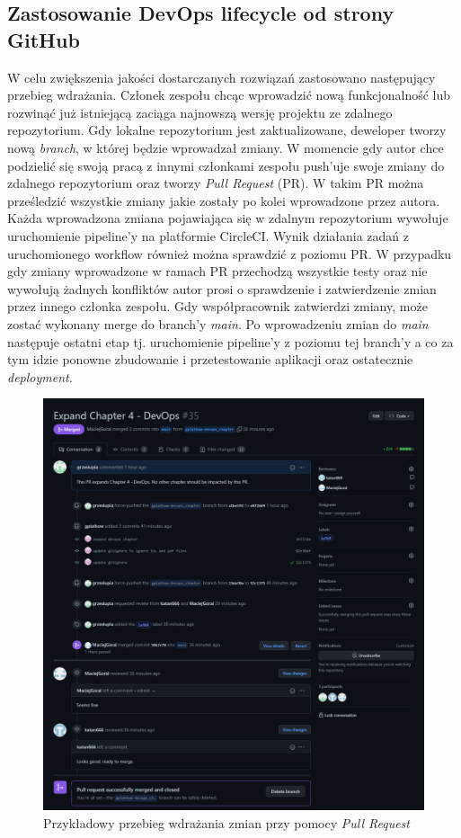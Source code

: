 	\subsection{Zastosowanie DevOps lifecycle od strony GitHub}
	W celu zwiększenia jakości dostarczanych rozwiązań zastosowano następujący przebieg wdrażania. Członek zespołu chcąc wprowadzić nową funkcjonalność lub rozwinąć już istniejącą zaciąga najnowszą wersję projektu ze zdalnego repozytorium. Gdy lokalne repozytorium jest zaktualizowane, deweloper tworzy nową \textit{branch}, w której będzie wprowadzał zmiany. W momencie gdy autor chce podzielić się swoją pracą z innymi członkami zespołu push'uje swoje zmiany do zdalnego repozytorium oraz tworzy \textit{Pull Request} (PR). W takim PR można prześledzić wszystkie zmiany jakie zostały po kolei wprowadzone przez autora. Każda wprowadzona zmiana pojawiająca się w zdalnym repozytorium wywołuje uruchomienie pipeline'y na platformie CircleCI. Wynik działania zadań z uruchomionego workflow również można sprawdzić z poziomu PR. W przypadku gdy zmiany wprowadzone w ramach PR przechodzą wszystkie testy oraz nie wywołują żadnych konfliktów autor prosi o sprawdzenie i zatwierdzenie zmian przez innego członka zespołu. Gdy współpracownik zatwierdzi zmiany, może zostać wykonany merge do branch'y \textit{main}. Po wprowadzeniu zmian do \textit{main} następuje ostatni etap tj. uruchomienie pipeline'y z poziomu tej branch'y a co za tym idzie ponowne zbudowanie i przetestowanie aplikacji oraz ostatecznie \textit{deployment}.
\begin{figure}[H]
\centering\includegraphics[width=\textwidth]{figures/github_pr}
\caption{Przykładowy przebieg wdrażania zmian przy pomocy \textit{Pull Request}}
\end{figure}
	
	 